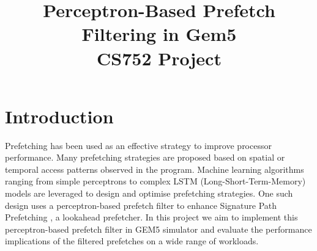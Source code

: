 \documentclass[conference]{IEEEtran}
\begin{document}
\title{Perceptron-Based Prefetch Filtering in Gem5\\ \Large{CS752 Project}}


\author{
\and
{}
}


\maketitle

\section{Introduction}
Prefetching has been used as an effective strategy to improve processor performance. Many prefetching strategies are proposed based on spatial or temporal access patterns observed in the program. Machine learning algorithms ranging from simple perceptrons to complex LSTM (Long-Short-Term-Memory) models are leveraged to design and optimise prefetching strategies. One such design uses a perceptron-based prefetch filter\cite{ppf} to enhance Signature Path Prefetching \cite{SPP}, a lookahead prefetcher. In this project we aim to implement this perceptron-based prefetch filter\cite{ppf} in GEM5 \cite{lowepower2020gem5} simulator and evaluate the performance implications of the filtered prefetches on a wide range of workloads. 
\end{document}
